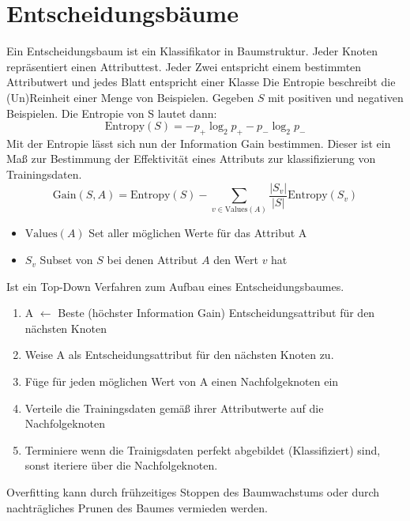 \chapter{Entscheidungsbäume}
Ein Entscheidungsbaum ist ein Klassifikator in Baumstruktur. Jeder Knoten
repräsentiert einen Attributtest. Jeder Zwei entspricht einem bestimmten
Attributwert und jedes Blatt entspricht einer Klasse
Die Entropie beschreibt die (Un)Reinheit einer Menge von Beispielen.
Gegeben $S$ mit positiven und negativen Beispielen. Die Entropie von S lautet
dann: \\
\begin{displaymath}
    \text{Entropy}(S) = -p_{+} \log_2 p_{+} - p_{-} \log_2 p_{-}
\end{displaymath}
Mit der Entropie lässt sich nun der Information Gain bestimmen. Dieser ist
 ein Maß zur Bestimmung der Effektivität eines Attributs zur klassifizierung von
 Trainingsdaten.
\begin{displaymath}
    \text{Gain}(S,A) = \text{Entropy}(S) - \sum_{v \in \text{Values}(A)}
    \frac{|S_v|}{|S|} \text{Entropy}(S_v)
\end{displaymath}
\begin{itemize}
    \item $\text{Values}(A)$ Set aller möglichen Werte für das Attribut A
    \item $S_v$ Subset von $S$ bei denen Attribut $A$ den Wert $v$ hat
\end{itemize}
Ist ein Top-Down Verfahren zum Aufbau eines Entscheidungsbaumes.
\begin{enumerate}
    \item A $\leftarrow$ Beste (höchster Information Gain) Entscheidungsattribut
     für den nächsten Knoten
    \item Weise A als Entscheidungsattribut für den nächsten Knoten zu.
    \item Füge für jeden möglichen Wert von A einen Nachfolgeknoten ein
    \item Verteile die Trainingsdaten gemäß ihrer Attributwerte auf die
    Nachfolgeknoten
    \item Terminiere wenn die Trainigsdaten perfekt abgebildet (Klassifiziert)
    sind, sonst iteriere über die Nachfolgeknoten.
\end{enumerate}

Overfitting kann durch frühzeitiges Stoppen des Baumwachstums oder durch
nachträgliches Prunen des Baumes vermieden werden.

